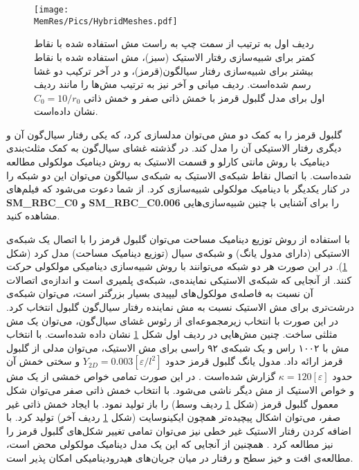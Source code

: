 \begin{figure}[h]
\begin{center}
\texttt{[image: \\MemRes/Pics/HybridMeshes.pdf]}
\caption{
ردیف اول به ترتیب از سمت چپ به راست مش‌ استفاده شده با نقاط کمتر  برای شبیه‌سازی رفتار الاستیک (سبز)، مش استفاده شده با نقاط بیشتر برای شبیه‌سازی رفتار سیالگون(قرمز)، و در آخر ترکیب دو غشا رسم شده‌است. ردیف میانی و آخر نیز به ترتیب مش‌ها را مانند ردیف اول برای 
مدل گلبول قرمز با خمش ذاتی صفر و خمش ذاتی 
$C_0=10/r_0$
نشان داده‌است.
}
\label{fig:hybridMeshes}
\end{center}
\end{figure}

 گلبول قرمز را به کمک دو مش می‌توان مدلسازی کرد، که یکی رفتار سیال‌گون آن  و دیگری رفتار الاستیکی آن را مدل کند. در گذشته غشای سیال‌گون به کمک مثلث‌بندی دینامیک با روش مانتی کارلو و قسمت الاستیک به روش دینامیک مولکولی مطالعه شده‌است. با اتصال نقاط شبکه‌ی الاستیک به شبکه‌ی سیالگون می‌توان این دو شبکه را در کنار یکدیگر با دینامیک مولکولی شبیه‌سازی کرد. از شما دعوت می‌شود که فیلم‌های
 {\bf  SM\_RBC\_C0}
 و
 {\bf SM\_RBC\_C0.006}
 را برای آشنایی با چنین شبیه‌سازی‌هایی مشاهده کنید.

با استفاده از روش توزیع دینامیک مساحت می‌توان گلبول قرمز را با اتصال یک شبکه‌ی الاستیکی (دارای مدول یانگ) و شبکه‌ی سیال‌ (توزیع دینامیک مساحت) مدل کرد (شکل
\ref{fig:hybridMeshes}).
  در این صورت هر دو شبکه می‌توانند با روش شبیه‌سازی دینامیکی مولکولی حرکت کنند. از آنجایی که شبکه‌ی الاستیکی نماینده‌ی، شبکه‌ی پلمیری است و اندازه‌ی اتصالات آن نسبت به فاصله‌ی مولکول‌های لیپیدی بسیار بزرگتر است، می‌توان شبکه‌ی درشت‌تری برای مش الاستیک نسبت به مش نماینده رفتار سیال‌گون گلبول انتخاب کرد. در این صورت با انتخاب زیرمجموعه‌ای از رئوس غشای سیال‌گون، می‌توان یک مش مثلثی ساخت. چنین مش‌هایی در ردیف اول شکل
\ref{fig:hybridMeshes}
نشان داده ‌شده‌است. با انتخاب مش با ۱۰۰۲ راس و یک شبکه‌ی ۹۲ راسی برای مش الاستیک، می‌توان مدلی از گلبول قرمز ارائه داد. مدول یانگ گلبول قرمز حدود 
$Y_{2D}=0.003 [\varepsilon/l^2]$
 و سختی خمش آن حدود
$\kappa=120 [\varepsilon]$ 
گزارش شده‌است
\cite{gomppernelson2012}.
 در این صورت تمامی خواص خمشی از یک مش و خواص الاستیک از مش دیگر ناشی می‌شود. با انتخاب خمش ذاتی صفر می‌توان شکل معمول گلبول قرمز (شکل 
\ref{fig:hybridMeshes}
ردیف وسط) را باز تولید نمود. با ایجاد خمش ذاتی غیر صفر، می‌توان اشکال پیچیده‌تر همچون ایکینوسایت 
(شکل
\ref{fig:hybridMeshes}
ردیف آخر) تولید کرد. با اضافه کردن رفتار الاستیک غیر خطی نیز می‌توان تمامی تغییر شکل‌های گلبول قرمز را نیز مطالعه کرد
\cite{Lim2002PNAS, Noguchi2005PNAS}.
 همچنین از آنجایی که این یک مدل دینامیک مولکولی‌ محض است، مطالعه‌ی افت و خیز سطح و رفتار در میان جریان‌های هیدرودینامیکی امکان پذیر است.






